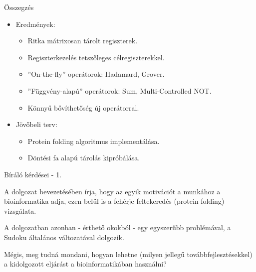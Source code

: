 \documentclass[aspectratio=169]{beamer}
\begin{document}
\begin{frame}{Összegzés}

\begin{itemize}
\item Eredmények:
\begin{itemize}
    \item Ritka mátrixosan tárolt regiszterek.
    \item Regiszterkezelés tetszőleges célregiszterekkel.
    \item ''On-the-fly'' operátorok: Hadamard, Grover.
    \item ''Függvény-alapú'' operátorok: Sum, Multi-Controlled NOT.
    \item Könnyű bővíthetőség új operátorral.
\end{itemize}
\item Jövőbeli terv:
\begin{itemize}
    \item Protein folding algoritmus implementálása.
    \item Döntési fa alapú tárolás kipróbálása.
\end{itemize}
\end{itemize}

\end{frame}



\begin{frame}{Bíráló kérdései - 1.}

A dolgozat bevezetésében írja, hogy az egyik motivációt a munkához a bioinformatika adja, ezen belül is a fehérje feltekeredés (protein folding) vizsgálata.

A dolgozatban azonban - érthető okokból - egy egyszerűbb problémával, a Sudoku általános változatával dolgozik.

Mégis, meg tudná mondani, hogyan lehetne (milyen jellegű továbbfejlesztésekkel) a kidolgozott eljárást a bioinformatikában használni?
\end{frame}
\end{document}
